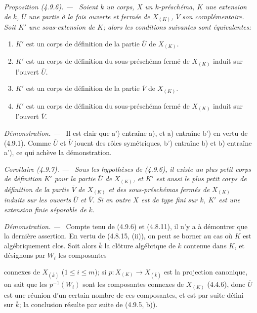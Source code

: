 \documentclass[10pt,oneside]{book}
\newcommand{\oldpage}[2][]{%
  \setcounter{footnote}{0}%
  \marginpar{\scriptsize\textbf{#1}~|~#2}\ignorespaces}
\newenvironment{proposition}[1][]{%
  \par\medskip\noindent\itshape Proposition (#1). ---\ }{\par}
\newenvironment{corollary}[1][]{%
  \par\medskip\noindent\itshape Corollaire (#1). ---\ }{\par}
\newenvironment{proof}{%
  \par\medskip\noindent\textit{Démonstration. ---\ }}{\par}
\begin{document}
\begin{proposition}[4.9.6]
\label{IV.2.4.9.6-fr}
Soient $k$ un corps, $X$ un $k$-préschéma, $K$ une extension de $k$,
$\overline U$ une partie à la fois ouverte et fermée de $X_{(K)}$,
$\overline V$ son complémentaire. Soit $K'$ une sous-extension de $K$;
alors les conditions suivantes sont équivalentes:
\begin{enumerate}
\item[a)] $K'$ est un corps de définition de la partie $\overline U$ de
$X_{(K)}$.
\item[a')] $K'$ est un corps de définition du sous-préschéma fermé de
$X_{(K)}$ induit sur l'ouvert $\overline U$.
\item[b)] $K'$ est un corps de définition de la partie $\overline V$ de
$X_{(K)}$.
\item[b')] $K'$ est un corps de définition du sous-préschéma fermé de
$X_{(K)}$ induit sur l'ouvert $\overline V$.
\end{enumerate}
\end{proposition}

\begin{proof}
Il est clair que a') entraîne a), et a) entraîne b') en vertu de (4.9.1).
Comme $\overline U$ et $\overline V$ jouent des rôles symétriques, b')
entraîne b) et b) entraîne a'), ce qui achève la démonstration.
\end{proof}

\begin{corollary}[4.9.7]
\label{IV.2.4.9.7-fr}
Sous les hypothèses de (4.9.6), il existe un plus petit corps de définition
$K'$ pour la partie $\overline U$ de $X_{(K)}$, et $K'$ est aussi le plus
petit corps de définition de la partie $\overline V$ de $X_{(K)}$ et des
sous-préschémas fermés de $X_{(K)}$ induits sur les ouverts $\overline U$ et
$\overline V$. Si en outre $X$ est de type fini sur $k$, $K'$ est une
extension finie séparable de $k$.
\end{corollary}

\begin{proof}
Compte tenu de (4.9.6) et (4.8.11), il n'y a à démontrer que la dernière
assertion. En vertu de (4.8.15, (ii)), on peut se borner au cas où $K$ est
algébriquement clos. Soit alors $\overline k$ la clôture algébrique de $k$
contenue dans $K$, et désignons par $W_i$ les composantes

\oldpage[IV-2]{86}

connexes de $X_{(\overline k)}$ ($1\leq i\leq m$); si
$p:X_{(K)}\to X_{(\overline k)}$ est la projection canonique, on sait que les
$p^{-1}(W_i)$ sont les composantes connexes de $X_{(K)}$ (4.4.6), donc
$\overline U$ est une réunion d'un certain nombre de ces composantes, et est
par suite défini sur $\overline k$; la conclusion résulte par suite de
(4.9.5, b)).
\end{proof}
\end{document}
